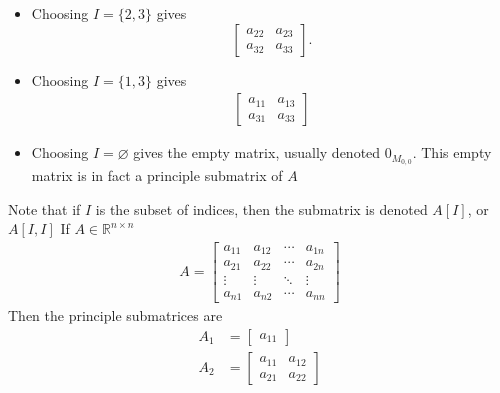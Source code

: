 \documentclass{report}
\begin{document}
\begin{itemize}
\begin{itemize}
                \item Choosing $I = \{2,3\}$ gives
                    \[
                        \begin{bmatrix}
                            a_{22} & a_{23} \\
                            a_{32} & a_{33}
                        \end{bmatrix}.
                    \]
                \item Choosing $I = \{1,3\} $ gives
                    \begin{align*}
                        \begin{bmatrix}
                            a_{11} & a_{13} \\
                            a_{31} & a_{33}
                        \end{bmatrix}
                    \end{align*}
                \item Choosing $I = \varnothing$ gives the empty matrix, usually denoted $0_{M_{0,0}}$. This empty matrix is in fact a principle submatrix of $A$
            \end{itemize}
            \bigbreak \noindent 
            Note that if $I$ is the subset of indices, then the submatrix is denoted $A[I]$, or $A[I,I]$
            \bigbreak \noindent 
            If $A\in\mathbb{R}^{n\times n} $
            \begin{align*}
                A = \begin{bmatrix}
                    a_{11} & a_{12} & \cdots &a_{1n} \\
                    a_{21} & a_{22} & \cdots &a_{2n} \\
                    \vdots & \vdots & \ddots & \vdots \\
                    a_{n1} & a_{n2} & \cdots &a_{nn}
                \end{bmatrix}
            \end{align*}
            Then the principle submatrices are
            \begin{align*}
                A_{1} &= \begin{bmatrix}
                    a_{11}
                \end{bmatrix} \\
                    A_{2} &= \begin{bmatrix}
                    a_{11} & a_{12} \\
                    a_{21} & a_{22}
                \end{bmatrix} \\

\end{align*}
\end{itemize}
\end{document}

